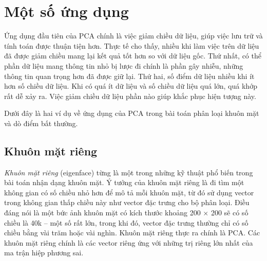  
 
 
 
 
 
\section{Một số ứng dụng}
 Ứng dụng đầu tiên của PCA chính là việc giảm chiều dữ liệu, giúp
 việc lưu trữ và tính toán được thuận tiện hơn. Thực tế cho thấy, nhiều khi làm
 việc trên dữ liệu đã được giảm chiều mang lại kết quả tốt hơn so với dữ liệu
 gốc. Thứ nhất, có thể phần dữ liệu mang thông tin nhỏ bị lược đi chính là phần
 gây nhiễu, những thông tin quan trọng hơn đã được giữ lại. Thứ hai, số điểm dữ
 liệu nhiều khi ít hơn số chiều dữ liệu. Khi có quá ít dữ liệu và số chiều dữ
 liệu quá lớn, quá khớp rất dễ xảy ra. Việc giảm chiều dữ liệu phần nào giúp
 khắc phục hiện tượng này. 

 Dưới đây là hai ví dụ về ứng dụng của PCA trong bài toán phân loại khuôn mặt và dò điểm bất thường. 
 
\subsection{Khuôn mặt riêng}
\textit{Khuôn mặt riêng} (eigenface) từng là một trong những kỹ thuật phổ biến
trong bài toán nhận dạng khuôn mặt. Ý tưởng của khuôn mặt riêng là đi tìm một
không gian có số chiều nhỏ hơn để mô tả mỗi khuôn mặt, từ đó sử dụng vector
trong không gian thấp chiều này như vector đặc trưng cho bộ phân loại. Điều đáng
nói là một bức ảnh khuôn mặt có kích thước khoảng 200 $\times$ 200 sẽ có số
chiều là 40k -- một số rất lớn, trong khi đó, vector đặc trưng thường chỉ có số
chiều bằng vài trăm hoặc vài nghìn. Khuôn mặt riêng thực ra chính là PCA. Các
khuôn mặt riêng chính là các vector riêng ứng với những trị riêng lớn nhất của
ma trận hiệp phương sai.

